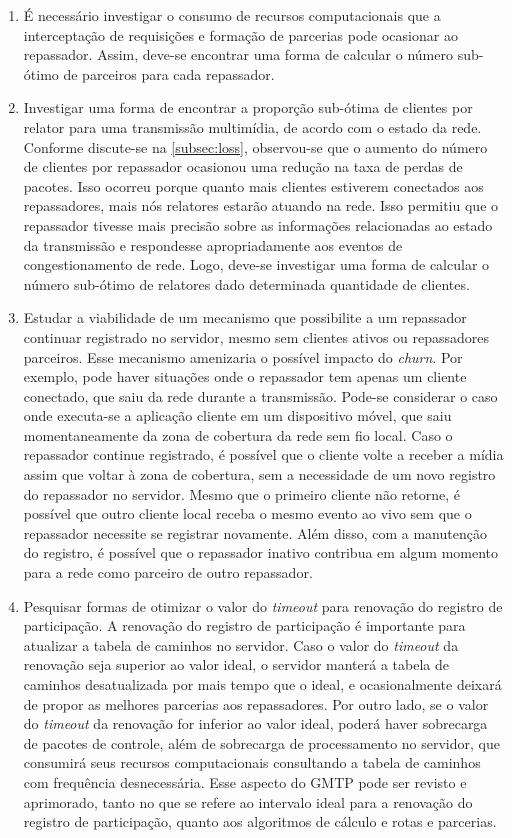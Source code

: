 \begin{enumerate}
\item É necessário investigar o consumo de recursos computacionais que a interceptação de requisições e formação de parcerias pode ocasionar ao repassador. Assim, deve-se encontrar uma forma de calcular o número sub-ótimo de parceiros para cada repassador. 

\item Investigar uma forma de encontrar a proporção sub-ótima de clientes por relator para uma transmissão multimídia, de acordo com o estado da rede. 
Conforme discute-se na \ref{subsec:loss}, observou-se que o aumento do número de clientes por repassador ocasionou uma redução na taxa de perdas de pacotes. Isso ocorreu porque quanto mais clientes estiverem conectados aos repassadores, mais nós relatores estarão atuando na rede. Isso permitiu que o repassador tivesse mais precisão sobre as informações relacionadas ao estado da transmissão e respondesse apropriadamente aos eventos de congestionamento de rede.
Logo, deve-se investigar uma forma de calcular o número sub-ótimo de relatores dado determinada quantidade de clientes.

\item Estudar a viabilidade de um mecanismo que possibilite a um repassador continuar registrado no servidor, mesmo sem clientes ativos ou repassadores parceiros. Esse mecanismo amenizaria o possível impacto do \textit{churn}. Por exemplo, pode haver situações onde o repassador tem apenas um cliente conectado, que saiu da rede durante a transmissão. Pode-se considerar o caso onde executa-se a aplicação cliente em um dispositivo móvel, que saiu momentaneamente da zona de cobertura da rede sem fio local.
Caso o repassador continue registrado, é possível que o cliente volte a receber a mídia assim que voltar à zona de cobertura, sem a necessidade de um novo registro do repassador no servidor.
Mesmo que o primeiro cliente não retorne, é possível que outro cliente local receba o mesmo evento ao vivo sem que o repassador necessite se registrar novamente.  
Além disso, com a manutenção do registro, é possível que o repassador inativo contribua em algum momento para a rede como parceiro de outro repassador.

\item Pesquisar formas de otimizar o valor do \textit{timeout} para renovação do registro de participação. A renovação do registro de participação é importante para atualizar a tabela de caminhos no servidor. Caso o valor do \textit{timeout} da renovação seja superior ao valor ideal, o servidor manterá a tabela de caminhos desatualizada por mais tempo que o ideal, e ocasionalmente deixará de propor as melhores parcerias aos repassadores. Por outro lado, se o valor do \textit{timeout} da renovação for inferior ao valor ideal, poderá haver sobrecarga de pacotes de controle, além de sobrecarga de processamento no servidor, que consumirá seus recursos computacionais consultando a tabela de caminhos com frequência desnecessária.
Esse aspecto do GMTP pode ser revisto e aprimorado, tanto no que se refere ao intervalo ideal para a renovação do registro de participação, quanto aos algoritmos de cálculo e rotas e parcerias.


\end{enumerate}
